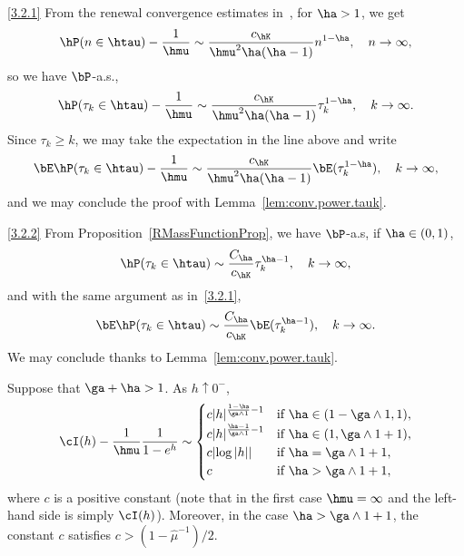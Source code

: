 \begin{proofc}

\begin{step}{\eqref{3.2.1}}
From the renewal convergence estimates in~\cite[Lemma~4]{Fr82}, for $\ha > 1$, we get
\begin{equation}
\hP(n \in \htau) - \frac{1}{\hmu} \sim \frac{c_{\hK}}{\hmu^2 \ha (\ha - 1)} n^{1 - \ha}, \quad n \to \infty,
\end{equation}
so we have $\bP$-a.s.,
\begin{equation}
\hP(\tau_k \in \htau) - \frac{1}{\hmu} \sim \frac{c_{\hK}}{\hmu^2 \ha (\ha - 1)} \tau_k^{1 - \ha}, \quad k \to \infty.
\end{equation}
Since $\tau_k \geq k$, we may take the expectation in the line above and write
\begin{equation}
\bE \hP(\tau_k \in \htau) - \frac{1}{\hmu} \sim \frac{c_{\hK}}{\hmu^2 \ha (\ha - 1)} \bE(\tau_k^{1 - \ha}), \quad k \to \infty,
\end{equation}
and we may conclude the proof with Lemma~\ref{lem:conv.power.tauk}.
\end{step}

\begin{laststep}{\eqref{3.2.2}}
From Proposition~\ref{RMassFunctionProp}, we have $\bP$-a.s, if $\ha \in (0,1)$,
\begin{equation}
\hP(\tau_k \in \htau) \sim \frac{C_{\ha}}{c_{\hK}} \tau_k^{\ha - 1},\quad k \to \infty,
\end{equation}
and with the same argument as in~\eqref{3.2.1},
\begin{equation}
\bE \hP(\tau_k \in \htau) \sim \frac{C_{\ha}}{c_{\hK}} \bE(\tau_k^{\ha - 1}), \quad k \to \infty.
\end{equation}
We may conclude thanks to Lemma~\ref{lem:conv.power.tauk}.
\end{laststep}
\let\qed\relax
\end{proofc}

\begin{lemm}\label{lem:asympt.I}
Suppose that $\ga + \ha > 1$. As $h \uparrow 0^-$,
\begin{equation}
\cI(h) - \frac{1}{\hmu} \frac{1}{1 - e^h} \sim 
\begin{cases}
c|h|^{\frac{1-\ha}{\ga\wedge 1} - 1} & \text{if } \ha \in (1-\ga\wedge 1, 1),\\
c|h|^{\frac{\ha - 1}{\ga\wedge 1} - 1} & \text{if } \ha \in (1, \ga \wedge 1+1),\\
c|{\log |h|}| & \text{if } \ha = \ga \wedge 1+1,\\
c & \text{if } \ha > \ga \wedge 1+1,
\end{cases}
\end{equation}
where $c$ is a positive constant (note that in the first case $\hmu = \infty$ and the left-hand side is simply $\cI(h)$). Moreover, in the case $ \ha > \ga \wedge 1+1$, the constant $c$ satisfies $c>(1-\hat \mu^{-1})/2$.
\end{lemm}

